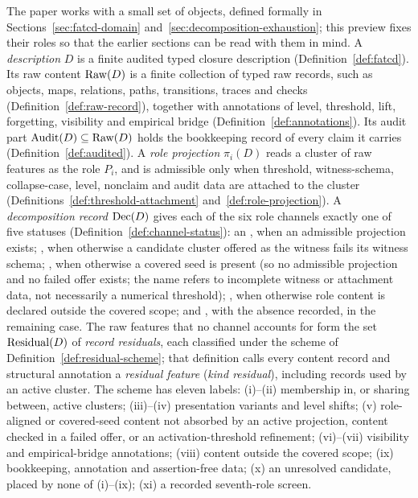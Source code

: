The paper works with a small set of objects, defined formally in
Sections~\ref{sec:fatcd-domain} and~\ref{sec:decomposition-exhaustion};
this preview fixes their roles so that the earlier sections can be read with
them in mind. A \emph{description} \(D\) is a finite audited typed closure
description (Definition~\ref{def:fatcd}). Its raw content \(\operatorname{Raw}\!\left(D\right)\) is a
finite collection of typed raw records, such as objects, maps, relations,
paths, transitions, traces and checks (Definition~\ref{def:raw-record}),
together with annotations of level, threshold, lift, forgetting, visibility
and empirical bridge (Definition~\ref{def:annotations}). Its audit part
\(\operatorname{Audit}\!\left(D\right)\subseteq\operatorname{Raw}\!\left(D\right)\) holds the bookkeeping record of every claim it
carries (Definition~\ref{def:audited}). A \emph{role projection} \(\pi_i(D)\)
reads a cluster of raw features as the role \(P_i\), and is admissible only
when threshold, witness-schema, collapse-case, level, nonclaim and audit
data are attached to the cluster
(Definitions~\ref{def:threshold-attachment} and~\ref{def:role-projection}). A
\emph{decomposition record} \(\operatorname{Dec}\!\left(D\right)\) gives each of the six role channels
exactly one of five statuses (Definition~\ref{def:channel-status}): an
\activeproj{}, when an admissible projection exists; \collapsedbc{}, when
otherwise a candidate cluster offered as the witness fails its witness
schema; \belowthr{}, when otherwise a covered seed is present (so no
admissible projection and no failed offer exists; the name refers to incomplete
witness or attachment data, not necessarily a numerical threshold); \outsidescope{}, when otherwise
role content is declared outside the covered scope; and \absentrec{}, with the
absence recorded, in the remaining case. The
raw features that no channel accounts for form the set \(\operatorname{Residual}\!\left(D\right)\) of
\emph{record residuals}, each classified under the scheme of
Definition~\ref{def:residual-scheme}; that definition calls every content
record and structural annotation a \emph{residual feature} (\emph{kind
residual}), including records used by an active cluster. The
scheme has eleven labels: (i)--(ii) membership in, or sharing between, active
clusters; (iii)--(iv) presentation variants and level shifts; (v) role-aligned or covered-seed
content not absorbed by an active projection, content checked in a failed offer, or an activation-threshold refinement; (vi)--(vii) visibility and
empirical-bridge annotations; (viii) content outside the covered scope; (ix)
bookkeeping, annotation and assertion-free data; (x) an unresolved candidate,
placed by none of (i)--(ix); (xi) a recorded seventh-role screen.

